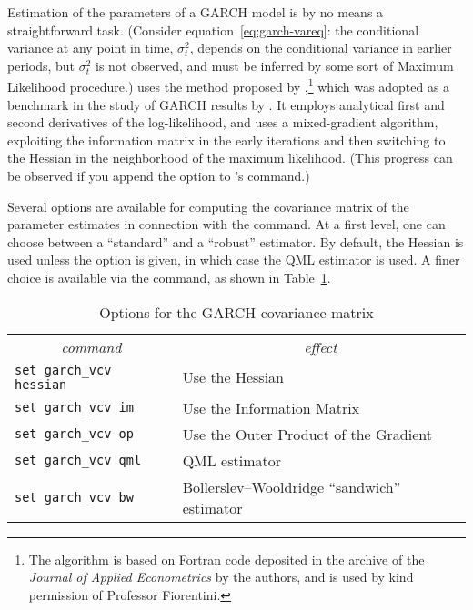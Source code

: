 Estimation of the parameters of a GARCH model is by no means a
straightforward task.  (Consider equation~\ref{eq:garch-vareq}: the
conditional variance at any point in time, $\sigma^2_t$, depends on
the conditional variance in earlier periods, but $\sigma^2_t$ is not
observed, and must be inferred by some sort of Maximum Likelihood
procedure.)   uses the method proposed by
\cite{fiorentini96},\footnote{The algorithm is based on Fortran code
  deposited in the archive of the \textit{Journal of Applied
    Econometrics} by the authors, and is used by kind permission of
  Professor Fiorentini.} which was adopted as a benchmark in the
study of GARCH results by \cite{mccullough98}.  It employs
analytical first and second derivatives of the log-likelihood, and
uses a mixed-gradient algorithm, exploiting the information matrix in
the early iterations and then switching to the Hessian in the
neighborhood of the maximum likelihood.  (This progress can be
observed if you append the  option to 's
 command.)

Several options are available for computing the covariance matrix of
the parameter estimates in connection with the  command.
At a first level, one can choose between a ``standard'' and a
``robust'' estimator.  By default, the Hessian is used unless the
 option is given, in which case the QML estimator is
used.  A finer choice is available via the  command, as
shown in Table~\ref{tab:garch-vcv}.

\begin{table}[htbp]
\caption{Options for the GARCH covariance matrix}
\label{tab:garch-vcv}
\begin{center}
\begin{tabular}{ll}
\multicolumn{1}{c}{\textit{command}} &
\multicolumn{1}{c}{\textit{effect}} \\ [4pt]
\texttt{set garch\_vcv hessian} & Use the Hessian \\
\texttt{set garch\_vcv im} & Use the Information Matrix \\
\texttt{set garch\_vcv op} & Use the Outer Product of the Gradient \\
\texttt{set garch\_vcv qml} & QML estimator \\
\texttt{set garch\_vcv bw} & Bollerslev--Wooldridge ``sandwich'' estimator
\end{tabular}
\end{center}
\end{table}

